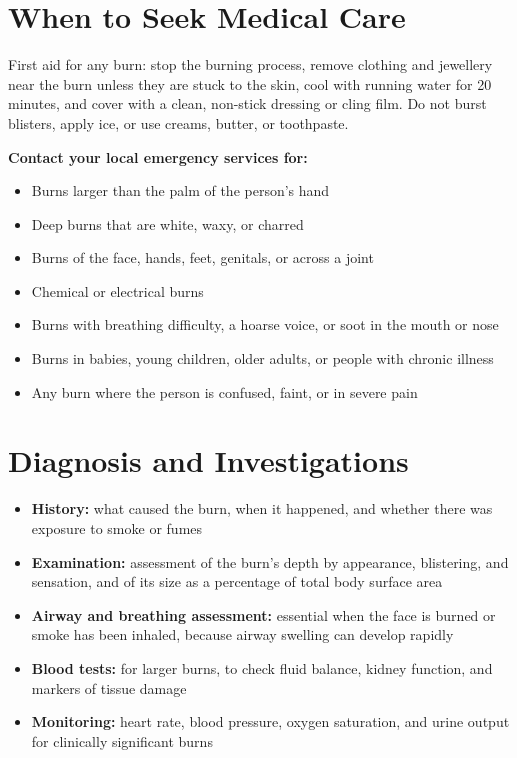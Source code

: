 \section*{When to Seek Medical Care}
First aid for any burn: stop the burning process, remove clothing and jewellery near the burn unless they are stuck to the skin, cool with running water for 20 minutes, and cover with a clean, non-stick dressing or cling film. Do not burst blisters, apply ice, or use creams, butter, or toothpaste.

\textbf{Contact your local emergency services for:}
\begin{itemize}
    \item Burns larger than the palm of the person's hand
    \item Deep burns that are white, waxy, or charred
    \item Burns of the face, hands, feet, genitals, or across a joint
    \item Chemical or electrical burns
    \item Burns with breathing difficulty, a hoarse voice, or soot in the mouth or nose
    \item Burns in babies, young children, older adults, or people with chronic illness
    \item Any burn where the person is confused, faint, or in severe pain
\end{itemize}

\section*{Diagnosis and Investigations}
\begin{itemize}
    \item \textbf{History:} what caused the burn, when it happened, and whether there was exposure to smoke or fumes
    \item \textbf{Examination:} assessment of the burn's depth by appearance, blistering, and sensation, and of its size as a percentage of total body surface area
    \item \textbf{Airway and breathing assessment:} essential when the face is burned or smoke has been inhaled, because airway swelling can develop rapidly
    \item \textbf{Blood tests:} for larger burns, to check fluid balance, kidney function, and markers of tissue damage
    \item \textbf{Monitoring:} heart rate, blood pressure, oxygen saturation, and urine output for clinically significant burns
\end{itemize}

